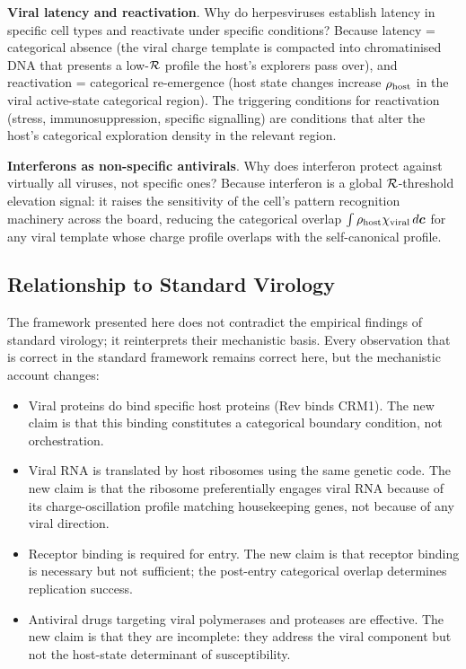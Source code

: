 \textbf{Viral latency and reactivation}. Why do herpesviruses establish latency in specific cell types and reactivate under specific conditions? Because latency = categorical absence (the viral charge template is compacted into chromatinised DNA that presents a low-$\mathcal{R}$ profile the host's explorers pass over), and reactivation = categorical re-emergence (host state changes increase $\rho_{\mathrm{host}}$ in the viral active-state categorical region). The triggering conditions for reactivation (stress, immunosuppression, specific signalling) are conditions that alter the host's categorical exploration density in the relevant region.

\textbf{Interferons as non-specific antivirals}. Why does interferon protect against virtually all viruses, not specific ones? Because interferon is a global $\mathcal{R}$-threshold elevation signal: it raises the sensitivity of the cell's pattern recognition machinery across the board, reducing the categorical overlap $\int \rho_{\mathrm{host}} \chi_{\mathrm{viral}}\,d\boldsymbol{c}$ for any viral template whose charge profile overlaps with the self-canonical profile.

\subsection{Relationship to Standard Virology}

The framework presented here does not contradict the empirical findings of standard virology; it reinterprets their mechanistic basis. Every observation that is correct in the standard framework remains correct here, but the mechanistic account changes:

\begin{itemize}
  \item Viral proteins do bind specific host proteins (Rev binds CRM1). The new claim is that this binding constitutes a categorical boundary condition, not orchestration.
  \item Viral RNA is translated by host ribosomes using the same genetic code. The new claim is that the ribosome preferentially engages viral RNA because of its charge-oscillation profile matching housekeeping genes, not because of any viral direction.
  \item Receptor binding is required for entry. The new claim is that receptor binding is necessary but not sufficient; the post-entry categorical overlap determines replication success.
  \item Antiviral drugs targeting viral polymerases and proteases are effective. The new claim is that they are incomplete: they address the viral component but not the host-state determinant of susceptibility.
\end{itemize}

